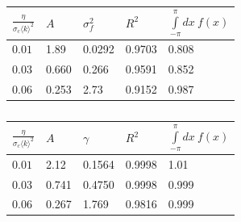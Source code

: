 \begin{figure}[tbp]
	\label{fig:cont_mean_field_G_C_LSQ}
\end{figure}
\begin{table}[tbp]
	\caption{(a) Parameters $A$, $\sigma_f^2$ for the least squares Gaussian fits in the left graph of \cref{fig:cont_mean_field_G_C_LSQ}.  For all fits $\mu_f < 10^{-6}$. (b) Parameters $A$, $\gamma$ for the least squares Cauchy distribution fits in the right graph of \cref{fig:cont_mean_field_G_C_LSQ}, where $\gamma$ is scale parameter of the distribution. For all fits the location parameter $x_0 < 10^{-4}$. The goodness of fit $R^2$ and the area under the curve are denoted in the last two columns.}
	\label{tab:fit_param_G_C_mean_field}
	\begin{subtable}{.475\linewidth}
		\centering
		\caption{}
		\begin{tabular}{l|llll}
			$\frac{\eta}{\sigma_c\langle k \rangle^2}$ & $A$                        & $\sigma_f^2$               & $R^2$ & $\int\limits_{-\pi}^\pi dx\ f(x)$  \\ \hline
			$0.01$                      & 1.89                       & 0.0292                  & 0.9703 &	0.808\\
			$0.03$                      & 0.660                      & 0.266                   & 0.9591 &	0.852\\ 
			$0.06$                      & 0.253         			 & 2.73					   & 0.9152 &	0.987\\
		\end{tabular}
	\end{subtable}%
	\hfill
	\begin{subtable}{.475\linewidth}
		\centering
		\caption{}
		\begin{tabular}{l|llll}
			$\frac{\eta}{\sigma_c\langle k \rangle^2}$ & $A$    & $\gamma$   & $R^2$ &	$\int\limits_{-\pi}^\pi dx\ f(x)$   \\ \hline
			$0.01$                      & 2.12   & 0.1564 & 0.9998 & 1.01	\\
			$0.03$                      & 0.741  & 0.4750 & 0.9998 & 0.999	\\
			$0.06$                      & 0.267  & 1.769  & 0.9816 & 0.999	
		\end{tabular}
	\end{subtable}%
\end{table}

